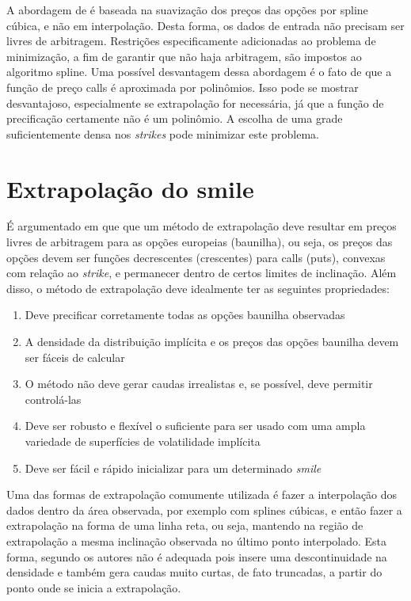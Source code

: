 \documentclass[]{book}
\providecommand{\tightlist}{%
  \setlength{\itemsep}{0pt}\setlength{\parskip}{0pt}}
\theoremstyle{definition}
\theoremstyle{definition}
\theoremstyle{definition}
\theoremstyle{remark}
\begin{document}
A abordagem de \citet{Fengler2012} é baseada na suavização dos preços das opções por spline cúbica, e não em interpolação. Desta forma, os dados de entrada não precisam ser livres de arbitragem. Restrições especificamente adicionadas ao problema de minimização, a fim de garantir que não haja arbitragem, são impostos ao algoritmo spline. Uma possível desvantagem dessa abordagem é o fato de que a função de preço calls é aproximada por polinômios. Isso pode se mostrar desvantajoso, especialmente se extrapolação for necessária, já que a função de precificação certamente não é um polinômio. A escolha de uma grade suficientemente densa nos \emph{strikes} pode minimizar este problema.

\hypertarget{extrapolacao-do-smile}{%
\section{Extrapolação do smile}\label{extrapolacao-do-smile}}

É argumentado em \citet{Benaim2008} que que um método de extrapolação deve resultar em preços livres de arbitragem para as opções europeias (baunilha), ou seja, os preços das opções devem ser funções decrescentes (crescentes) para calls (puts), convexas com relação ao \emph{strike}, e permanecer dentro de certos limites de inclinação. Além disso, o método de extrapolação deve idealmente ter as seguintes propriedades:

\begin{enumerate}
\def\labelenumi{\arabic{enumi}.}
\tightlist
\item
  Deve precificar corretamente todas as opções baunilha observadas
\item
  A densidade da distribuição implícita e os preços das opções baunilha devem ser fáceis de calcular
\item
  O método não deve gerar caudas irrealistas e, se possível, deve permitir controlá-las
\item
  Deve ser robusto e flexível o suficiente para ser usado com uma ampla variedade de superfícies de volatilidade implícita
\item
  Deve ser fácil e rápido inicializar para um determinado \emph{smile}
\end{enumerate}

Uma das formas de extrapolação comumente utilizada é fazer a interpolação dos dados dentro da área observada, por exemplo com splines cúbicas, e então fazer a extrapolação na forma de uma linha reta, ou seja, mantendo na região de extrapolação a mesma inclinação observada no último ponto interpolado. Esta forma, segundo os autores não é adequada pois insere uma descontinuidade na densidade e também gera caudas muito curtas, de fato truncadas, a partir do ponto onde se inicia a extrapolação.
\end{document}

